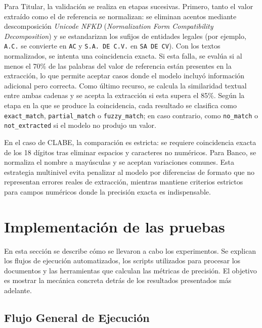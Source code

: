 Para Titular, la validación se realiza en etapas sucesivas. Primero, tanto el valor extraído como el de referencia se normalizan: se eliminan acentos mediante descomposición \textit{Unicode NFKD} (\textit{Normalization Form Compatibility Decomposition}) y se estandarizan los sufijos de entidades legales (por ejemplo, \texttt{A.C.} se convierte en \texttt{AC} y \texttt{S.A. DE C.V.} en \texttt{SA DE CV}). Con los textos normalizados, se intenta una coincidencia exacta. Si esta falla, se evalúa si al menos el 70\% de las palabras del valor de referencia están presentes en la extracción, lo que permite aceptar casos donde el modelo incluyó información adicional pero correcta. Como último recurso, se calcula la similaridad textual entre ambas cadenas y se acepta la extracción si esta supera el 85\%. Según la etapa en la que se produce la coincidencia, cada resultado se clasifica como \texttt{exact\_match}, \texttt{partial\_match} o \texttt{fuzzy\_match}; en caso contrario, como \texttt{no\_match} o \texttt{not\_extracted} si el modelo no produjo un valor.

En el caso de CLABE, la comparación es estricta: se requiere coincidencia exacta de los 18 dígitos tras eliminar espacios y caracteres no numéricos. Para Banco, se normaliza el nombre a mayúsculas y se aceptan variaciones comunes. Esta estrategia multinivel evita penalizar al modelo por diferencias de formato que no representan errores reales de extracción, mientras mantiene criterios estrictos para campos numéricos donde la precisión exacta es indispensable.

\section{Implementación de las pruebas}

En esta sección se describe cómo se llevaron a cabo los experimentos. Se explican los flujos de ejecución automatizados, los scripts utilizados para procesar los documentos y las herramientas que calculan las métricas de precisión. El objetivo es mostrar la mecánica concreta detrás de los resultados presentados más adelante.

\subsection{Flujo General de Ejecución}

